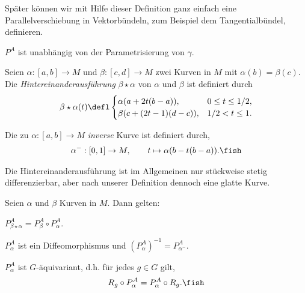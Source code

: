 \documentclass[%
	paper=a5,%
	fleqn,%
	DIV=18,%
	BCOR=0mm,
	fontsize=11pt,
	titlepage=false,%
	bibliography=totoc,
	DIV=18,%
	twoside=true,
	pdftitle=Riemannsche Geometrie,
	pdfauthor=Uwe Semmelmann,
	numbers=noendperiod]%
	{scrbook}
\begin{document}
Später können wir mit Hilfe dieser Definition ganz einfach eine
Parallelverschiebung in Vektorbündeln, zum Beispiel dem Tangentialbündel, definieren.

\begin{rem}
$P^A$ ist unabhängig von der Parametrisierung von $\gamma$.
\end{rem}

\begin{defn}
\begin{defnenum}
\item
Seien $\alpha\colon [a,b]\to M$ und $\beta\colon [c,d]\to M$ zwei Kurven in $M$ mit
$\alpha(b) = \beta(c)$. Die \emph{Hintereinanderausführung} $\beta\star\alpha$
von $\alpha$ und $\beta$ ist definiert durch
\begin{align*}
\beta\star\alpha(t) \defl 
\begin{cases}
\alpha(a + 2t(b-a)), & 0\le t \le 1/2,\\
\beta(c + (2t-1)(d-c)), & 1/2 < t \le 1.
\end{cases}
\end{align*}
\item Die zu $\alpha\colon [a,b]\to M$ \emph{inverse} Kurve ist definiert durch,
\begin{align*}
\alpha^- : [0,1]\to M,\qquad t\mapsto \alpha(b-t(b-a)).\fish
\end{align*} 
\end{defnenum}
\end{defn}

Die Hintereinanderausführung ist im Allgemeinen nur stückweise stetig
differenzierbar, aber nach unserer Definition dennoch eine glatte Kurve.

\begin{prop}
Seien $\alpha$ und $\beta$ Kurven in $M$. Dann gelten:
\begin{propenum}
\item $P_{\beta\star\alpha}^A = P_\beta^A \circ P_\alpha^A$.
\item $P_\alpha^A$ ist ein Diffeomorphismus und $(P_\alpha^A)^{-1} =
P_{\alpha^-}^A$.
\item $P_\alpha^A$ ist $G$-äquivariant, d.h. für jedes $g\in G$ gilt,
\begin{align*}
R_g \circ P_\alpha^A = P_\alpha^A \circ R_g.\fish
\end{align*}
\end{propenum}
\end{prop}
\end{document}
